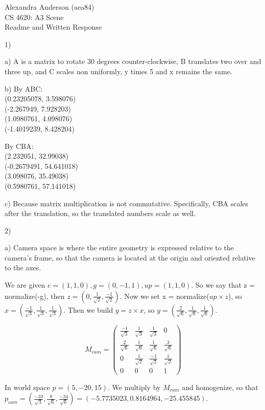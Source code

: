 \documentclass{letter}
\begin{document}
Alexandra Anderson (aea84)
\\CS 4620: A3 Scene
\\Readme and Written Response

1) 

a) A is a matrix to rotate 30 degrees counter-clockwise, B translates two over and three up, and C scales non uniformly, y times 5 and x remains the same. 

b)
By ABC: 
\\({0.23205078, 3.598076})
\\({-2.267949, 7.928203})
\\({1.0980761, 4.098076})
\\({-1.4019239, 8.428204})

By CBA: 
\\({2.232051, 32.99038})
\\({-0.2679491, 54.641018})
\\({3.098076, 35.49038})
\\({0.5980761, 57.141018})

c) Because matrix multiplication is not commutative. Specifically, CBA scales after the translation, so the translated numbers scale as well.

2) 

a) Camera space is where the entire geometry is expressed relative to the camera's frame, so that the camera is located at the origin and oriented relative to the axes.

We are given $e = (1, 1, 0), g = (0, -1, 1), up = (1, 1, 0)$. So we say that z = normalize(-g), then $z = (0, \frac{1}{\sqrt{2}}, \frac{-1}{\sqrt{2}})$. Now we set x = normalize(${up} \times z$), so $x = (\frac{-1}{\sqrt{3}}, \frac{1}{\sqrt{3}}, \frac{1}{\sqrt{3}})$. Then we build $y = z \times x$, so $y = (\frac{2}{\sqrt{6}}, \frac{1}{\sqrt{6}}, \frac{1}{\sqrt{6}})$. 

$$M_{cam} = 
\begin{pmatrix}
\frac{-1}{\sqrt{3}} & \frac{1}{\sqrt{3}} & \frac{1}{\sqrt{3}} & 0 \\[0.5em]
\frac{2}{\sqrt{6}} & \frac{1}{\sqrt{6}} & \frac{1}{\sqrt{6}} & \frac{3}{\sqrt{6}} \\[0.5em]
0 &  \frac{1}{\sqrt{2}} & \frac{-1}{\sqrt{2}} & \frac{1}{\sqrt{2} } \\[0.5em]
0 & 0 & 0 & 1
\end{pmatrix}
$$

In world space $p = (5, -20, 15)$. We multiply by $M_{cam}$ and homogenize, so that $p_{cam} = (\frac{-10}{\sqrt{3}}, \frac{8}{\sqrt{6}}, \frac{-34}{\sqrt{6}}) = (-5.7735023, 0.8164964, -25.455845)$. 
\end{document}

